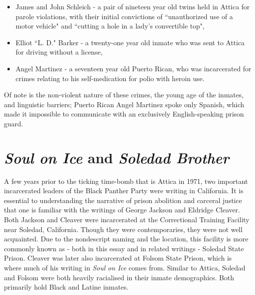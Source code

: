 \documentclass[14pt, letterpaper]{report}
\begin{document}
    \begin{itemize}
    
	    \item James and John Schleich - a pair of nineteen year old twins held in 
	    Attica for parole 
	    violations, with their initial convictions of ``unauthorized use of a motor 
	    vehicle" and ``cutting a hole in a lady's convertible top",
	    
	    \item Elliot ``L. D." Barker - a twenty-one year old inmate who was sent to 
	    Attica for driving without a license,
	    
	    \item Angel Martinez - a seventeen year old Puerto Rican, who was incarcerated 
	    for crimes relating to his self-medication for polio with heroin use.
	    
    
    \end{itemize}
    
    Of note is the non-violent nature of these crimes, the young age of the 
    inmates, and linguistic barriers; Puerto Rican Angel Martinez spoke only 
    Spanish, which made it impossible to communicate with an exclusively 
    English-speaking prison guard. \autocite[7]{blood-in-water}
    
    \section*{\textit{Soul on Ice} and \textit{Soledad Brother}}    
    
	A few years prior to the ticking time-bomb that is Attica in 1971, two 
	important incarcerated leaders of the Black Panther Party were writing 
	in California. It is essential to understanding the narrative of prison 
	abolition and carceral justice that one is familiar with the writings of 
	George Jackson and Eldridge Cleaver. Both Jackson and Cleaver were 
	incarcerated at the Correctional Training Facility near Soledad, California.
	Though they were contemporaries, they were not well acquainted. 
	Due to the nondescript naming and the location, this facility is more 
	commonly known as - both in this essay and in related writings - Soledad 
	State Prison. Cleaver was later also incarcerated at Folsom State Prison, 
	which is where much of his writing in \textit{Soul on Ice} comes from. 
	Similar to Attica, Soledad and Folsom were both heavily racialised in 
	their inmate demographics. Both primarily hold Black and Latine inmates.
\end{document}
